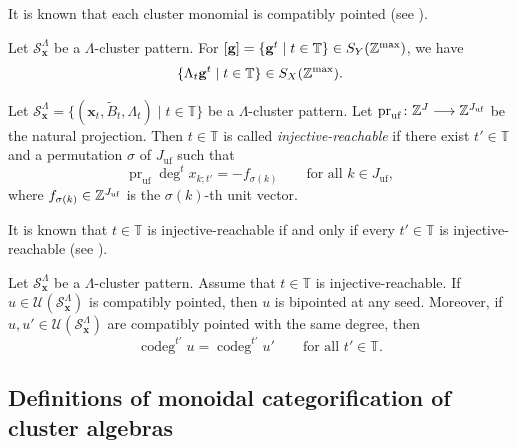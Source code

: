 It is known that each cluster monomial is compatibly pointed
(see \cite{DWZ10, GHKK18}).

\begin{Lem}
\label{Lem : tropical points and Lambda}
Let $\mathcal{S}_{\mathbf{x}}^{\Lambda}$
be a $\Lambda$-cluster pattern.
For $[\mathbf{g}] = \{\mathbf{g}^t \mid t \in \mathbb{T}\}
\in S_Y(\mathbb{Z}^{\max})$, we have
\[
\{\Lambda_t\mathbf{g}^t \mid t \in \mathbb{T}\}
\in S_X(\mathbb{Z}^{\max}).
\]
\end{Lem}

\begin{Def}
\label{Def : injective reachable seeds}
Let
$\mathcal{S}_{\mathbf{x}}^{\Lambda}
= \{(\mathbf{x}_t, \widetilde{B}_t, \Lambda_t)
\mid t \in \mathbb{T}\}$
be a $\Lambda$-cluster pattern.
Let $\operatorname{pr}_{\mathrm{uf}} \colon
\mathbb{Z}^J \longrightarrow \mathbb{Z}^{J_{\mathrm{uf}}}$
be the natural projection.
Then $t \in \mathbb{T}$ is called \emph{injective-reachable}
if there exist $t' \in \mathbb{T}$
and a permutation $\sigma$ of $J_{\mathrm{uf}}$ such that
\[
\operatorname{pr}_{\mathrm{uf}}\deg^t x_{k;t'}
= -f_{\sigma(k)}
\qquad \text{for all $k \in J_{\mathrm{uf}}$},
\]
where $f_{\sigma(k)} \in \mathbb{Z}^{J_{\mathrm{uf}}}$
is the $\sigma(k)$-th unit vector.
\end{Def}

It is known that $t \in \mathbb{T}$ is injective-reachable
if and only if every $t' \in \mathbb{T}$ is injective-reachable
(see \cite{Qin17}).

\begin{Prop}
\label{Prop : compatible pointedness and bipointedness}
Let $\mathcal{S}_{\mathbf{x}}^{\Lambda}$
be a $\Lambda$-cluster pattern.
Assume that $t \in \mathbb{T}$ is injective-reachable.
If $u \in \mathcal{U}(\mathcal{S}_{\mathbf{x}}^{\Lambda})$
is compatibly pointed, then $u$ is bipointed at any seed.
Moreover, if
$u, u' \in \mathcal{U}(\mathcal{S}_{\mathbf{x}}^{\Lambda})$
are compatibly pointed with the same degree, then
\[
\operatorname{codeg}^{t'}u = \operatorname{codeg}^{t'}u'
\qquad \text{for all $t' \in \mathbb{T}$}.
\]
\end{Prop}


\subsection{Definitions of monoidal categorification of cluster algebras}
\label{ssec : definitions of monoidal categorification}

